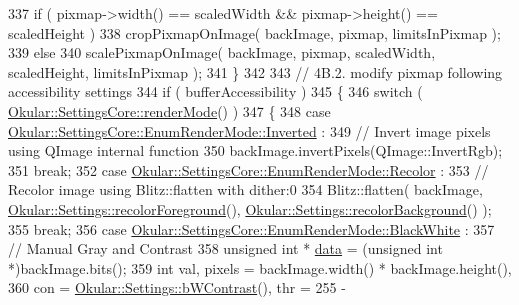 \begin{DoxyCode}
337             \textcolor{keywordflow}{if} ( pixmap->width() == scaledWidth && pixmap->height() == scaledHeight )
338                 cropPixmapOnImage( backImage, pixmap, limitsInPixmap );
339             \textcolor{keywordflow}{else}
340                 scalePixmapOnImage( backImage, pixmap, scaledWidth, scaledHeight, limitsInPixmap );
341         \}
342 
343         \textcolor{comment}{// 4B.2. modify pixmap following accessibility settings}
344         \textcolor{keywordflow}{if} ( bufferAccessibility )
345         \{
346             \textcolor{keywordflow}{switch} ( \hyperlink{classOkular_1_1SettingsCore_a6fcb9ee5ad7a92b49ad31344771cca2d}{Okular::SettingsCore::renderMode}() )
347             \{
348                 \textcolor{keywordflow}{case} \hyperlink{classOkular_1_1SettingsCore_1_1EnumRenderMode_aae172bdb345dda4d639e763709ea357aae3a52d8c06b668f28a3f3d646c49d3b0}{Okular::SettingsCore::EnumRenderMode::Inverted}
      :
349                     \textcolor{comment}{// Invert image pixels using QImage internal function}
350                     backImage.invertPixels(QImage::InvertRgb);
351                     \textcolor{keywordflow}{break};
352                 \textcolor{keywordflow}{case} \hyperlink{classOkular_1_1SettingsCore_1_1EnumRenderMode_aae172bdb345dda4d639e763709ea357aa4ed9520dc788e5254440ebd166aedbd8}{Okular::SettingsCore::EnumRenderMode::Recolor}
      :
353                     \textcolor{comment}{// Recolor image using Blitz::flatten with dither:0}
354                     Blitz::flatten( backImage, 
      \hyperlink{classOkular_1_1Settings_ad2fa94bea1f5cd63394fb0eb43515f72}{Okular::Settings::recolorForeground}(), 
      \hyperlink{classOkular_1_1Settings_a3b5300e5e203a1d4e9d08b2edfe4f152}{Okular::Settings::recolorBackground}() );
355                     \textcolor{keywordflow}{break};
356                 \textcolor{keywordflow}{case} \hyperlink{classOkular_1_1SettingsCore_1_1EnumRenderMode_aae172bdb345dda4d639e763709ea357aacfc5ee223333e478da6fb379a9eaa23a}{Okular::SettingsCore::EnumRenderMode::BlackWhite}
      :
357                     \textcolor{comment}{// Manual Gray and Contrast}
358                     \textcolor{keywordtype}{unsigned} \textcolor{keywordtype}{int} * \hyperlink{structdrawinf_af73f66288002f0a25c7843a534bf1340}{data} = (\textcolor{keywordtype}{unsigned} \textcolor{keywordtype}{int} *)backImage.bits();
359                     \textcolor{keywordtype}{int} val, pixels = backImage.width() * backImage.height(),
360                         con = \hyperlink{classOkular_1_1Settings_a3f705adb7a04efb41f5f6acd6ef3bab9}{Okular::Settings::bWContrast}(), thr = 255 - 

\end{DoxyCode}
